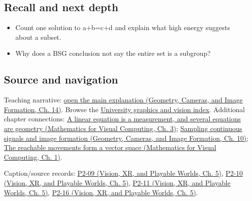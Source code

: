 \subsection{Recall and next depth}\label{appendix-b0732b22e7d6-recall-and-next-depth}

\begin{itemize}
\tightlist
\item
  Count one solution to a+b=c+d and explain what high energy suggests about a subset.
\item
  Why does a BSG conclusion not say the entire set is a subgroup?
\end{itemize}

\subsection{Source and navigation}\label{appendix-b0732b22e7d6-source-and-navigation}

Teaching narrative: \href{../03-Geometry-Cameras-and-Image-Formation/main.pdf\#nameddest=04-visual-computing-ii-ch033-additive-structure-explains-repeated-coincidences}{open the main explanation (Geometry, Cameras, and Image Formation, Ch. 14)}. Browse the \hyperref[appendix-a6d556a4ef50-university-graphics-vision-and-photography---independent-series]{University graphics and vision index}. Additional chapter connections: \href{../02-Mathematics-for-Visual-Computing/main.pdf\#nameddest=01-foundations-i-ch019-a-linear-equation-is-a-measurement-and-several-equations-are-geometry}{A linear equation is a measurement, and several equations are geometry (Mathematics for Visual Computing, Ch. 3)}; \href{../03-Geometry-Cameras-and-Image-Formation/main.pdf\#nameddest=03-visual-computing-i-ch003-sampling-continuous-signals-and-image-formation}{Sampling continuous signals and image formation (Geometry, Cameras, and Image Formation, Ch. 10)}; \href{../02-Mathematics-for-Visual-Computing/main.pdf\#nameddest=01-foundations-i-ch017-the-reachable-movements-form-a-vector-space}{The reachable movements form a vector space (Mathematics for Visual Computing, Ch. 1)}.

Caption/source records: \href{../07-Vision-XR-and-Playable-Worlds/main.pdf\#nameddest=04-visual-computing-ii-ch036-p2-09---lecture-09-reflections-on-the-szemeredi-trotter-theorem}{P2-09 (Vision, XR, and Playable Worlds, Ch. 5)}, \href{../07-Vision-XR-and-Playable-Worlds/main.pdf\#nameddest=04-visual-computing-ii-ch036-p2-10---lecture-10-sum-product-theory}{P2-10 (Vision, XR, and Playable Worlds, Ch. 5)}, \href{../07-Vision-XR-and-Playable-Worlds/main.pdf\#nameddest=04-visual-computing-ii-ch036-p2-11---lecture-11-contagious-structure-in-projection-theory}{P2-11 (Vision, XR, and Playable Worlds, Ch. 5)}, \href{../07-Vision-XR-and-Playable-Worlds/main.pdf\#nameddest=04-visual-computing-ii-ch036-p2-16---lecture-16-the-bourgain-projection-theorem-part-3}{P2-16 (Vision, XR, and Playable Worlds, Ch. 5)}.
